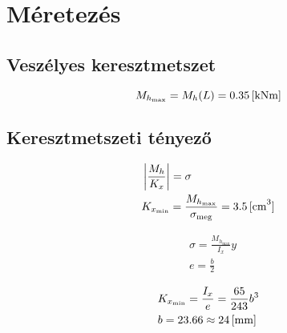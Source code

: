 \section{Méretezés}

\subsection{Veszélyes keresztmetszet}
\begin{equation*}
	M_{h_\text{max}} = M_h(L) = \SI{0.35}{[\kilo\newton\meter]}
\end{equation*}

\subsection{Keresztmetszeti tényező}

\begin{align*}
	&\left|\frac{M_h}{K_x}\right| = \sigma \\
	&K_{x_\text{min}} = \frac{M_{h_\text{max}}}{\sigma_\text{meg}} = \siunit{3.5}{\cm^3}
\end{align*}

\begin{align*}
	&\sigma = \frac{M_{h_\text{max}}}{I_x} y \\
	&e = \frac{b}{2}
\end{align*}

\begin{align*}
	&K_{x_\text{min}} 
	= \frac{I_x}{e} = \frac{65}{243} b^3 \\
	&b = 23.66 \approx \siunit{24}{\mm}
\end{align*}
